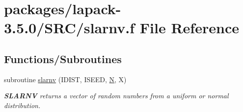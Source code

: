 \hypertarget{slarnv_8f}{}\section{packages/lapack-\/3.5.0/\+S\+R\+C/slarnv.f File Reference}
\label{slarnv_8f}
\subsection*{Functions/\+Subroutines}
\begin{DoxyCompactItemize}
\item 
subroutine \hyperlink{group__auxOTHERauxiliary_ga379b09e3d4e7635db614d3b3973db5e7}{slarnv} (I\+D\+I\+S\+T, I\+S\+E\+E\+D, \hyperlink{polmisc_8c_a0240ac851181b84ac374872dc5434ee4}{N}, X)
\begin{DoxyCompactList}\small\item\em {\bfseries S\+L\+A\+R\+N\+V} returns a vector of random numbers from a uniform or normal distribution. \end{DoxyCompactList}\end{DoxyCompactItemize}

